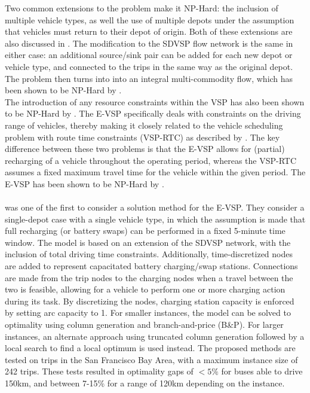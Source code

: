 \documentclass[]{article}
\begin{document}
Two common extensions to the problem make it NP-Hard: the inclusion of multiple vehicle types, as well the use of multiple depots under the assumption that vehicles must return to their depot of origin. Both of these extensions are also discussed in \citet{Bunte2009}. The modification to the SDVSP flow network is the same in either case: an additional source/sink pair can be added for each new depot or vehicle type, and connected to the trips in the same way as the original depot. The problem then turns into into an integral multi-commodity flow, which has been shown to be NP-Hard by \citet{Even1975}. \\
The introduction of any resource constraints within the VSP has also been shown to be NP-Hard by
\citet{Bodin1983}. The E-VSP specifically deals with constraints on the driving range of vehicles, thereby making it closely related to the vehicle scheduling problem with route time constraints (VSP-RTC) as described by \citet{Haghani2002}. The key difference between these two problems is that the
E-VSP allows for (partial) recharging of a vehicle throughout the operating
period, whereas the VSP-RTC assumes a fixed maximum travel time for the
vehicle within the given period. The E-VSP has been shown to be NP-Hard by \citet{Sassi2014}. \\\\
\citet{Li2014} was one of the first to consider a solution method for the E-VSP. They consider a single-depot case with a single vehicle type, in which the assumption is made that full recharging (or battery swaps) can be performed in a fixed 5-minute time window. The model is based on an extension of the SDVSP network, with the inclusion of total driving time constraints. Additionally, time-discretized nodes are added to represent capacitated battery charging/swap stations. Connections are made from the trip nodes to the charging nodes when a travel between the two is feasible, allowing for a vehicle to perform one or more charging action during its task. By discretizing the nodes, charging station capacity is enforced by setting arc capacity to 1. For smaller instances, the model can be solved to optimality using column generation and branch-and-price (B\&P). For larger instances, an alternate approach using truncated column generation followed by a local search to find a local optimum is used instead. The proposed methods are tested on trips in the San Francisco Bay Area, with a maximum instance size of 242 trips. These tests resulted in optimality gaps of $<5\%$ for buses able to drive 150km, and between 7-15\%  for a range of 120km depending on the instance. \\
\end{document}
